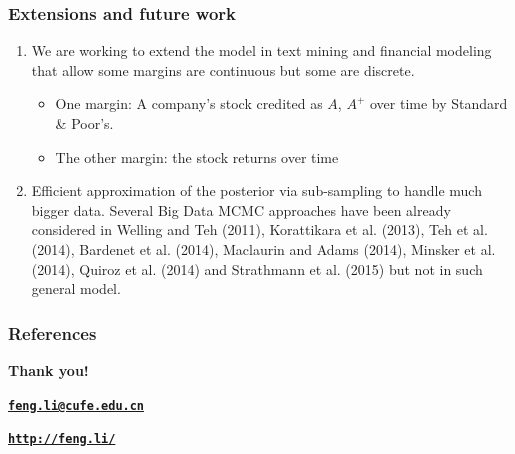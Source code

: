 \documentclass{beamer}
\begin{document}
\begin{frame}
  \frametitle{Extensions and future work}
  \begin{enumerate}
  \item We are working to extend the model in text mining and financial modeling that
    allow some margins are continuous but some are discrete.

    \begin{itemize}
    \item One margin: A company's stock credited as $A$, $A^+$ over time by
      Standard \& Poor's.
    \item The other margin: the stock returns over time
    \end{itemize}

  \item Efficient approximation of the posterior via sub-sampling to handle much bigger
    data. Several Big Data MCMC approaches have been already considered in
    {\color{blue}Welling and Teh (2011), Korattikara et al. (2013), Teh et al. (2014),
      Bardenet et al. (2014), Maclaurin and Adams (2014), Minsker et al.  (2014), Quiroz
      et al. (2014)} and {\color{blue}Strathmann et al. (2015)} but not in such general
    model.

  \end{enumerate}
\end{frame}

\begin{frame}[allowframebreaks]
  \frametitle{References}
  
  
\end{frame}

\begin{frame}[plain]
  \addtocounter{framenumber}{-1}
  \begin{center}
    {\color{SUblue} \textbf{\Huge Thank you!}}
    \vspace{1cm}

    {\texttt{\textbf{\url{feng.li@cufe.edu.cn}}}}

    \vspace{1cm}

    {\texttt{\textbf{\url{http://feng.li/}}}}

  \end{center}
\end{frame}
\end{document}
